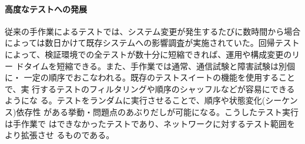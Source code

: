     \paragraph{高度なテストへの発展}
従来の手作業によるテストでは、システム変更が発生するたびに数時間から場合
によっては数日かけて既存システムへの影響調査が実施されていた。回帰テスト
によって、検証環境での全テストが数十分に短縮できれば、運用や構成変更のリー
ドタイムを短縮できる。また、手作業では通常、通信試験と障害試験は別個に・
一定の順序でおこなわれる。既存のテストスイートの機能を使用することで、実
行するテストのフィルタリングや順序のシャッフルなどが容易にできるようにな
る。テストをランダムに実行させることで、順序や状態変化(シーケンス)依存性
がある挙動・問題点のあぶりだしが可能になる。こうしたテスト実行は手作業で
はできなかったテストであり、ネットワークに対するテスト範囲をより拡張させ
るものである。

